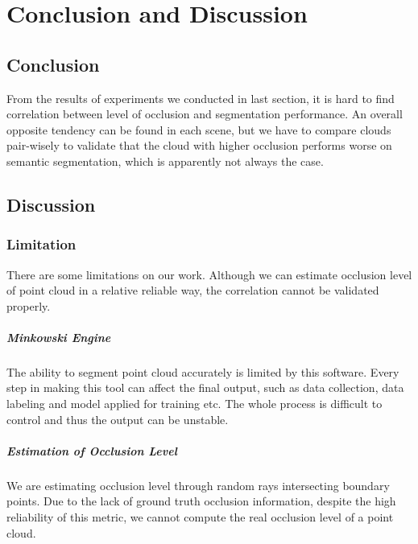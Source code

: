 \documentclass[11pt, a4paper,oneside,chapterprefix=false]{scrbook}
\begin{document}
\chapter{Conclusion and Discussion} \label{chp:conclusion}

\section{Conclusion}

From the results of experiments we conducted in last section, it is hard to find correlation between level of occlusion and segmentation performance. An overall opposite tendency can be found in each scene, but we have to compare clouds pair-wisely to validate that the cloud with higher occlusion performs worse on semantic segmentation, which is apparently not always the case.

\section{Discussion}

\subsection{Limitation}

There are some limitations on our work. Although we can estimate occlusion level of point cloud in a relative reliable way, the correlation cannot be validated properly. 

\paragraph{Minkowski Engine}

The ability to segment point cloud accurately is limited by this software. Every step in making this tool can affect the final output, such as data collection, data labeling and model applied for training etc. The whole process is difficult to control and thus the output can be unstable. 

\paragraph{Estimation of Occlusion Level}

We are estimating occlusion level through random rays intersecting boundary points. Due to the lack of ground truth occlusion information, despite the high reliability of this metric, we cannot compute the real occlusion level of a point cloud.
\end{document}
